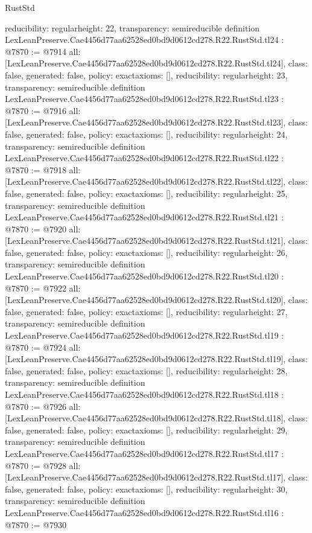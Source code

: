 \begin{lexlean}{RustStd}
\begin{coremodule}
{  reducibility: regular{height: 22},
  transparency: semireducible
}
definition LexLeanPreserve.Cae4456d77aa62528ed0bd9d0612cd278.R22.RustStd.tl24 : @7870 := @7914 {
  all: [LexLeanPreserve.Cae4456d77aa62528ed0bd9d0612cd278.R22.RustStd.tl24],
  class: false,
  generated: false,
  policy: exact{axioms: []},
  reducibility: regular{height: 23},
  transparency: semireducible
}
definition LexLeanPreserve.Cae4456d77aa62528ed0bd9d0612cd278.R22.RustStd.tl23 : @7870 := @7916 {
  all: [LexLeanPreserve.Cae4456d77aa62528ed0bd9d0612cd278.R22.RustStd.tl23],
  class: false,
  generated: false,
  policy: exact{axioms: []},
  reducibility: regular{height: 24},
  transparency: semireducible
}
definition LexLeanPreserve.Cae4456d77aa62528ed0bd9d0612cd278.R22.RustStd.tl22 : @7870 := @7918 {
  all: [LexLeanPreserve.Cae4456d77aa62528ed0bd9d0612cd278.R22.RustStd.tl22],
  class: false,
  generated: false,
  policy: exact{axioms: []},
  reducibility: regular{height: 25},
  transparency: semireducible
}
definition LexLeanPreserve.Cae4456d77aa62528ed0bd9d0612cd278.R22.RustStd.tl21 : @7870 := @7920 {
  all: [LexLeanPreserve.Cae4456d77aa62528ed0bd9d0612cd278.R22.RustStd.tl21],
  class: false,
  generated: false,
  policy: exact{axioms: []},
  reducibility: regular{height: 26},
  transparency: semireducible
}
definition LexLeanPreserve.Cae4456d77aa62528ed0bd9d0612cd278.R22.RustStd.tl20 : @7870 := @7922 {
  all: [LexLeanPreserve.Cae4456d77aa62528ed0bd9d0612cd278.R22.RustStd.tl20],
  class: false,
  generated: false,
  policy: exact{axioms: []},
  reducibility: regular{height: 27},
  transparency: semireducible
}
definition LexLeanPreserve.Cae4456d77aa62528ed0bd9d0612cd278.R22.RustStd.tl19 : @7870 := @7924 {
  all: [LexLeanPreserve.Cae4456d77aa62528ed0bd9d0612cd278.R22.RustStd.tl19],
  class: false,
  generated: false,
  policy: exact{axioms: []},
  reducibility: regular{height: 28},
  transparency: semireducible
}
definition LexLeanPreserve.Cae4456d77aa62528ed0bd9d0612cd278.R22.RustStd.tl18 : @7870 := @7926 {
  all: [LexLeanPreserve.Cae4456d77aa62528ed0bd9d0612cd278.R22.RustStd.tl18],
  class: false,
  generated: false,
  policy: exact{axioms: []},
  reducibility: regular{height: 29},
  transparency: semireducible
}
definition LexLeanPreserve.Cae4456d77aa62528ed0bd9d0612cd278.R22.RustStd.tl17 : @7870 := @7928 {
  all: [LexLeanPreserve.Cae4456d77aa62528ed0bd9d0612cd278.R22.RustStd.tl17],
  class: false,
  generated: false,
  policy: exact{axioms: []},
  reducibility: regular{height: 30},
  transparency: semireducible
}
definition LexLeanPreserve.Cae4456d77aa62528ed0bd9d0612cd278.R22.RustStd.tl16 : @7870 := @7930 {
}
\end{coremodule}
\end{lexlean}

